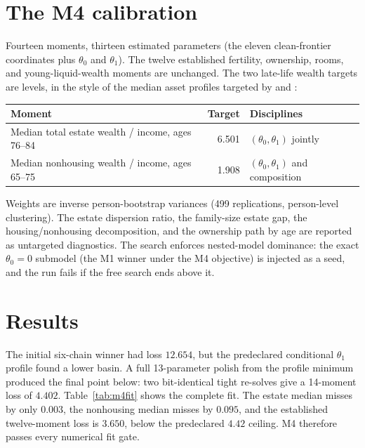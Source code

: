 \documentclass[10pt]{article}
\begin{document}
\section{The M4 calibration}

Fourteen moments, thirteen estimated parameters (the eleven clean-frontier
coordinates plus $\theta_0$ and $\theta_1$). The twelve established fertility, ownership,
rooms, and young-liquid-wealth moments are unchanged. The two late-life
wealth targets are levels, in the style of the median asset profiles targeted
by \citet{denardifrenchjones2010} and \citet{nakajima2017}:

\begin{center}
\begin{tabular}{lrl}
\toprule
Moment & Target & Disciplines \\
\midrule
Median total estate wealth / income, ages 76--84 & 6.501 & $(\theta_0,\theta_1)$ jointly \\
Median nonhousing wealth / income, ages 65--75 & 1.908 & $(\theta_0,\theta_1)$ and composition \\
\bottomrule
\end{tabular}
\end{center}

Weights are inverse person-bootstrap variances (499 replications, person-level
clustering). The estate dispersion ratio, the family-size estate gap, the
housing/nonhousing decomposition, and the ownership path by age are reported
as untargeted diagnostics. The search enforces nested-model dominance: the
exact $\theta_0=0$ submodel (the M1 winner under the M4 objective) is injected
as a seed, and the run fails if the free search ends above it.

\section{Results}

The initial six-chain winner had loss $12.654$, but the predeclared conditional
$\theta_1$ profile found a lower basin. A full 13-parameter polish from the
profile minimum produced the final point below: two bit-identical tight
re-solves give a 14-moment loss of $4.402$. Table~\ref{tab:m4fit} shows the
complete fit. The estate median misses by only $0.003$, the nonhousing median
misses by $0.095$, and the established twelve-moment loss is $3.650$, below
the predeclared $4.42$ ceiling. M4 therefore passes every numerical fit gate.
\end{document}

